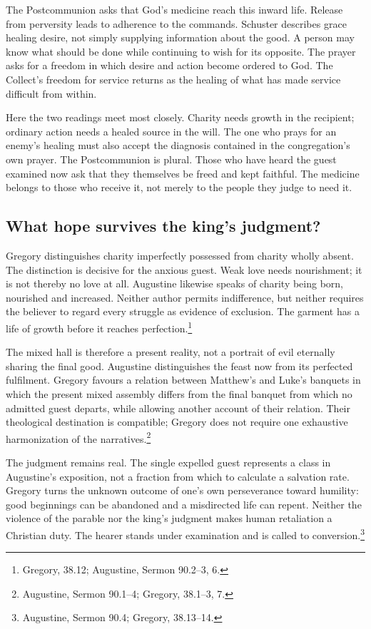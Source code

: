 The Postcommunion asks that God's medicine reach this inward
life. Release from perversity leads to adherence to the commands.
Schuster describes grace healing desire, not simply supplying
information about the good. A person may know what should be
done while continuing to wish for its opposite. The prayer asks
for a freedom in which desire and action become ordered to God.
The Collect's freedom for service returns as the healing of
what has made service difficult from within.

Here the two readings meet most closely. Charity needs growth
in the recipient; ordinary action needs a healed source in the
will. The one who prays for an enemy's healing must also accept
the diagnosis contained in the congregation's own prayer.
The Postcommunion is plural. Those who have heard the guest
examined now ask that they themselves be freed and kept faithful.
The medicine belongs to those who receive it, not merely to the
people they judge to need it.

\subsection{What hope survives the king's judgment?}

Gregory distinguishes charity imperfectly possessed from charity
wholly absent. The distinction is decisive for the anxious guest.
Weak love needs nourishment; it is not thereby no love at all.
Augustine likewise speaks of charity being born, nourished and
increased. Neither author permits indifference, but neither
requires the believer to regard every struggle as evidence of
exclusion. The garment has a life of growth before it reaches
perfection.\footnote{Gregory,  38.12;
Augustine, Sermon 90.2--3, 6.}

The mixed hall is therefore a present reality, not a portrait
of evil eternally sharing the final good. Augustine distinguishes
the feast now from its perfected fulfilment. Gregory favours a
relation between Matthew's and Luke's banquets in which the
present mixed assembly differs from the final banquet from
which no admitted guest departs, while allowing another account
of their relation. Their theological destination is compatible;
Gregory does not require one exhaustive harmonization of the
narratives.\footnote{Augustine, Sermon 90.1--4; Gregory,
 38.1--3, 7.}

The judgment remains real. The single expelled guest represents
a class in Augustine's exposition, not a fraction from which
to calculate a salvation rate. Gregory turns the unknown outcome
of one's own perseverance toward humility: good beginnings can
be abandoned and a misdirected life can repent. Neither the
violence of the parable nor the king's judgment makes human
retaliation a Christian duty. The hearer stands under examination
and is called to conversion.\footnote{Augustine, Sermon 90.4;
Gregory,  38.13--14.}

